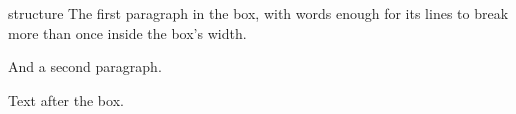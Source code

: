 \documentclass{beamer}
\begin{document}
\begin{frame}
\begin{beamercolorbox}{structure}
The first paragraph in the box, with words enough for its lines to break more than once inside the box's width.

And a second paragraph.
\end{beamercolorbox}
Text after the box.
\end{frame}
\end{document}
